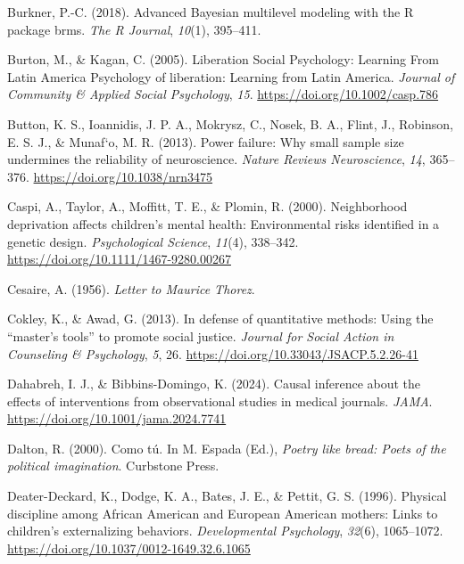 \documentclass[
  letterpaper,
  DIV=11,
  numbers=noendperiod]{scrreprt}
\newlength{\cslhangindent}
\newenvironment{CSLReferences}[2] %
 {\begin{list}{}{%
  \setlength{\itemindent}{0pt}
  \setlength{\leftmargin}{0pt}
  \setlength{\parsep}{0pt}
  \ifodd #1
   \setlength{\leftmargin}{\cslhangindent}
   \setlength{\itemindent}{-1\cslhangindent}
  \fi
  \setlength{\itemsep}{#2\baselineskip}}}
 {\end{list}}
\begin{document}
\begin{CSLReferences}{1}{0}
Burkner, P.-C. (2018). Advanced {B}ayesian multilevel modeling with the
{R} package brms. \emph{The R Journal}, \emph{10}(1), 395--411.

Burton, M., \& Kagan, C. (2005). {Liberation Social Psychology: Learning
From Latin America Psychology of liberation: Learning from Latin
America}. \emph{Journal of Community \& Applied Social Psychology},
\emph{15}. \url{https://doi.org/10.1002/casp.786}

Button, K. S., Ioannidis, J. P. A., Mokrysz, C., Nosek, B. A., Flint,
J., Robinson, E. S. J., \& Munaf`o, M. R. (2013). Power failure: Why
small sample size undermines the reliability of neuroscience.
\emph{Nature Reviews Neuroscience}, \emph{14}, 365--376.
\url{https://doi.org/10.1038/nrn3475}

Caspi, A., Taylor, A., Moffitt, T. E., \& Plomin, R. (2000).
Neighborhood deprivation affects children's mental health: Environmental
risks identified in a genetic design. \emph{Psychological Science},
\emph{11}(4), 338--342. \url{https://doi.org/10.1111/1467-9280.00267}

Cesaire, A. (1956). \emph{Letter to {M}aurice {T}horez}.

Cokley, K., \& Awad, G. (2013). In defense of quantitative methods:
Using the {``master's tools''} to promote social justice. \emph{Journal
for Social Action in Counseling \& Psychology}, \emph{5}, 26.
\url{https://doi.org/10.33043/JSACP.5.2.26-41}

Dahabreh, I. J., \& Bibbins-Domingo, K. (2024). Causal inference about
the effects of interventions from observational studies in medical
journals. \emph{JAMA}. \url{https://doi.org/10.1001/jama.2024.7741}

Dalton, R. (2000). Como t{ú}. In M. Espada (Ed.), \emph{Poetry like
bread: Poets of the political imagination}. Curbstone Press.

Deater-Deckard, K., Dodge, K. A., Bates, J. E., \& Pettit, G. S. (1996).
{Physical discipline among African American and European American
mothers: Links to children's externalizing behaviors.}
\emph{Developmental Psychology}, \emph{32}(6), 1065--1072.
\url{https://doi.org/10.1037/0012-1649.32.6.1065}


\end{CSLReferences}
\end{document}
